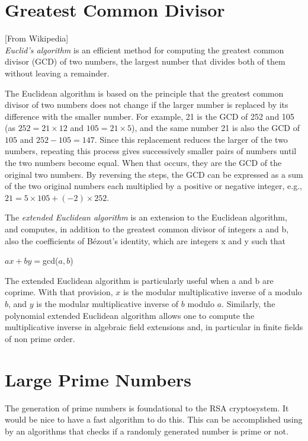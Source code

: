 \documentclass[twoside]{article}
\begin{document}
\section{Greatest Common Divisor}


[From Wikipedia] \\
\textit{Euclid's algorithm} is an efficient method for computing the greatest common divisor (GCD) of two numbers, the largest number that divides both of them without leaving a remainder. 

The Euclidean algorithm is based on the principle that the greatest common divisor of two numbers does not change if the larger number is replaced by its difference with the smaller number. For example, 21 is the GCD of 252 and 105 (as $252 = 21 \times 12$ and $105 = 21 \times 5$), and the same number 21 is also the GCD of $105$ and $252 − 105 = 147$. Since this replacement reduces the larger of the two numbers, repeating this process gives successively smaller pairs of numbers until the two numbers become equal. When that occurs, they are the GCD of the original two numbers. By reversing the steps, the GCD can be expressed as a sum of the two original numbers each multiplied by a positive or negative integer, e.g., $21 = 5 \times 105 + (−2) \times 252$.

The \textit{extended Euclidean algorithm} is an extension to the Euclidean algorithm, and computes, in addition to the greatest common divisor of integers a and b, also the coefficients of Bézout's identity, which are integers x and y such that 

$ax+by=$gcd($a,b$)

The extended Euclidean algorithm is particularly useful when a and b are coprime. With that provision, $x$ is the modular multiplicative inverse of a modulo $b$, and $y$ is the modular multiplicative inverse of $b$ modulo $a$. Similarly, the polynomial extended Euclidean algorithm allows one to compute the multiplicative inverse in algebraic field extensions and, in particular in finite fields of non prime order. 

\section{Large Prime Numbers}

The generation of prime numbers is foundational to the RSA cryptosystem. It would be nice to have a fast algorithm to do this. This can be accomplished using by an algorithms that checks if a randomly generated number is prime or not.
\end{document}
